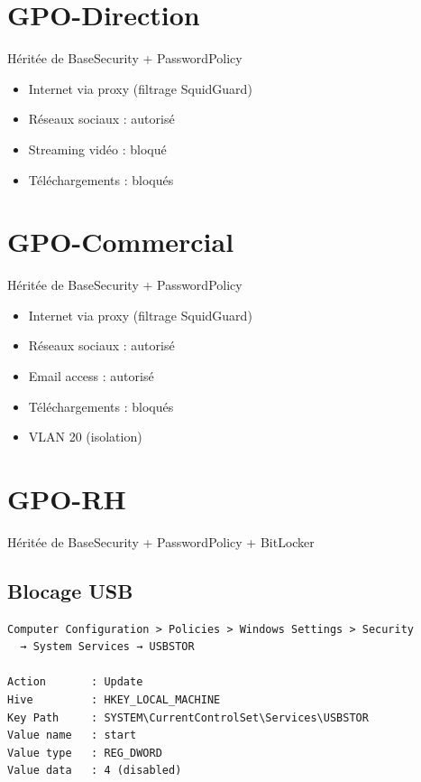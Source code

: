 \section{GPO-Direction}

Héritée de BaseSecurity + PasswordPolicy

\begin{itemize}
    \item Internet via proxy (filtrage SquidGuard)
    \item Réseaux sociaux : autorisé
    \item Streaming vidéo : bloqué
    \item Téléchargements : bloqués
\end{itemize}

\section{GPO-Commercial}

Héritée de BaseSecurity + PasswordPolicy

\begin{itemize}
    \item Internet via proxy (filtrage SquidGuard)
    \item Réseaux sociaux : autorisé
    \item Email access : autorisé
    \item Téléchargements : bloqués
    \item VLAN 20 (isolation)
\end{itemize}

\section{GPO-RH}

Héritée de BaseSecurity + PasswordPolicy + BitLocker

\subsection{Blocage USB}

\begin{lstlisting}
Computer Configuration > Policies > Windows Settings > Security
  → System Services → USBSTOR

Action       : Update
Hive         : HKEY_LOCAL_MACHINE
Key Path     : SYSTEM\CurrentControlSet\Services\USBSTOR
Value name   : start
Value type   : REG_DWORD
Value data   : 4 (disabled)
\end{lstlisting}

